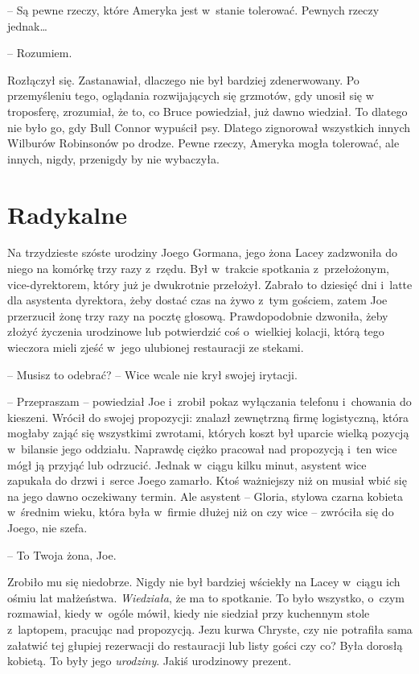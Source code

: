 \documentclass[oneside,polish,11pt,sfheadings]{mwbk}
\begin{document}
-- Są pewne rzeczy, które Ameryka jest w~stanie tolerować. Pewnych rzeczy
jednak\ldots 

-- Rozumiem.

Rozłączył się. Zastanawiał, dlaczego nie był bardziej zdenerwowany. Po
przemyśleniu tego, oglądania rozwijających się grzmotów, gdy unosił się
w troposferę, zrozumiał, że to, co Bruce powiedział, już dawno wiedział.
To dlatego nie było go, gdy Bull Connor wypuścił psy. Dlatego zignorował
wszystkich innych Wilburów Robinsonów po drodze. Pewne rzeczy, Ameryka
mogła tolerować, ale innych, nigdy, przenigdy by nie wybaczyła.

\chapter*{Radykalne}

Na trzydzieste szóste urodziny Joego Gormana, jego żona Lacey zadzwoniła
do niego na komórkę trzy razy z~rzędu. Był w~trakcie spotkania z~przełożonym, vice-dyrektorem, który już je dwukrotnie przełożył. Zabrało
to dziesięć dni i~latte dla asystenta dyrektora, żeby dostać czas na
żywo z~tym gościem, zatem Joe przerzucił żonę trzy razy na pocztę
głosową. Prawdopodobnie dzwoniła, żeby złożyć życzenia urodzinowe lub
potwierdzić coś o~wielkiej kolacji, którą tego wieczora mieli zjeść w~jego ulubionej restauracji ze stekami.

-- Musisz to odebrać? -- Wice wcale nie krył swojej irytacji.

-- Przepraszam -- powiedział Joe i~zrobił pokaz wyłączania telefonu i~chowania do kieszeni. Wrócił do swojej propozycji: znalazł zewnętrzną
firmę logistyczną, która mogłaby zająć się wszystkimi zwrotami, których
koszt był uparcie wielką pozycją w~bilansie jego oddziału. Naprawdę
ciężko pracował nad propozycją i~ten wice mógł ją przyjąć lub odrzucić.
Jednak w~ciągu kilku minut, asystent wice zapukała do drzwi i~serce
Joego zamarło. Ktoś ważniejszy niż on musiał wbić się na jego dawno
oczekiwany termin. Ale asystent -- Gloria, stylowa czarna kobieta w~średnim wieku, która była w~firmie dłużej niż on czy wice -- zwróciła się
do Joego, nie szefa.

-- To Twoja żona, Joe.

Zrobiło mu się niedobrze. Nigdy nie był bardziej wściekły na Lacey w~ciągu ich ośmiu lat małżeństwa. \textit{Wiedziała}, że ma to spotkanie. To
było wszystko, o~czym rozmawiał, kiedy w~ogóle mówił, kiedy nie siedział
przy kuchennym stole z~laptopem, pracując nad propozycją. Jezu kurwa
Chryste, czy nie potrafiła sama załatwić tej głupiej rezerwacji do
restauracji lub listy gości czy co? Była dorosłą kobietą. To były jego
\textit{urodziny}. Jakiś urodzinowy prezent.
\end{document}
